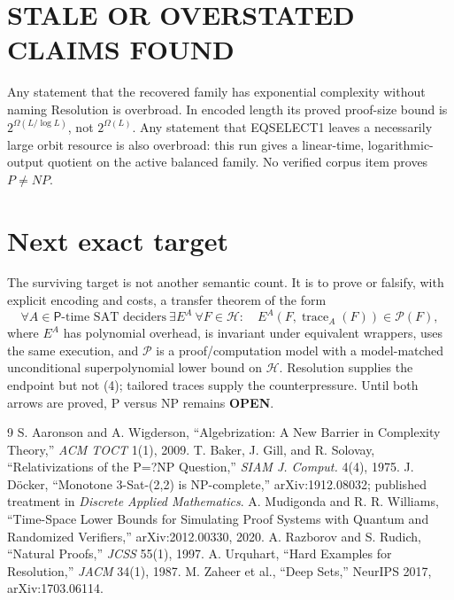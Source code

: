 \documentclass[11pt]{article}
\newcommand{\OPEN}{\textbf{OPEN}}
\begin{document}
\section{STALE OR OVERSTATED CLAIMS FOUND}
Any statement that the recovered family has exponential complexity without
naming Resolution is overbroad.  In encoded length its proved proof-size bound
is \(2^{\Omega(L/\log L)}\), not \(2^{\Omega(L)}\).  Any statement that
EQSELECT1 leaves a necessarily large orbit resource is also overbroad: this
run gives a linear-time, logarithmic-output quotient on the active balanced
family.  No verified corpus item proves \(P\ne NP\).

\section{Next exact target}
The surviving target is not another semantic count.  It is to prove or
falsify, with explicit encoding and costs, a transfer theorem of the form
\[
 \forall A\in\mathsf{P}\text{-time SAT deciders}\ \exists E^A\ \forall F
 \in\mathcal H:
 \quad E^A(F,\operatorname{trace}_A(F))\in\mathcal P(F),      \tag{4}
\]
where \(E^A\) has polynomial overhead, is invariant under equivalent wrappers,
uses the same execution, and \(\mathcal P\) is a proof/computation model with
a model-matched unconditional superpolynomial lower bound on \(\mathcal H\).
Resolution supplies the endpoint but not (4); tailored traces supply the
counterpressure.  Until both arrows are proved, P versus NP remains \OPEN.

\begin{thebibliography}{9}
 S. Aaronson and A. Wigderson, ``Algebrization: A New Barrier in Complexity Theory,'' \emph{ACM TOCT} 1(1), 2009.
 T. Baker, J. Gill, and R. Solovay, ``Relativizations of the P=?NP Question,'' \emph{SIAM J. Comput.} 4(4), 1975.
 J. D\"ocker, ``Monotone 3-Sat-(2,2) is NP-complete,'' arXiv:1912.08032; published treatment in \emph{Discrete Applied Mathematics}.
 A. Mudigonda and R. R. Williams, ``Time-Space Lower Bounds for Simulating Proof Systems with Quantum and Randomized Verifiers,'' arXiv:2012.00330, 2020.
 A. Razborov and S. Rudich, ``Natural Proofs,'' \emph{JCSS} 55(1), 1997.
 A. Urquhart, ``Hard Examples for Resolution,'' \emph{JACM} 34(1), 1987.
 M. Zaheer et al., ``Deep Sets,'' NeurIPS 2017, arXiv:1703.06114.
\end{thebibliography}
\end{document}
